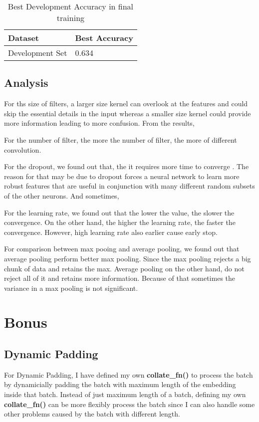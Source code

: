 \documentclass{article}
\begin{document}
\begin{table}[htb]
	\caption{Best Development Accuracy in final training}
	\label{sample-table}
	\centering
	\begin{tabular}{ll}
		\toprule
		\cmidrule{1-2}
		Dataset & Best Accuracy\\
		\midrule
		Development Set & 0.634   \\
		\bottomrule
	\end{tabular}
\end{table}

\subsection{Analysis}
For ths size of filters, a larger size kernel can overlook at the features and could skip the essential details in the input whereas a smaller size kernel could provide more information leading to more confusion. From the results,

For the number of filter, the more the number of filter, the more of different convolution. 

For the dropout, we found out that, the it requires more time to converge . The reason for that may be due to dropout forces a neural network to learn more robust features that are useful in conjunction with many different random subsets of the other neurons. And sometimes, 

For the learning rate, we found out that the lower the value, the slower the convergence. On the other hand, the higher the learning rate, the faster the convergence. However, high learning rate also earlier cause early stop.

For comparison between max pooing and average pooling, we found out that average pooling perform better max pooling. Since the max pooling rejects a big chunk of data and retains the max. Average pooling on the other hand, do not reject all of it and retains more information. Because of that sometimes the variance in a max pooling is not significant.

\section{Bonus}

\subsection{Dynamic Padding}
For Dynamic Padding, I have defined my own \textbf{collate\_fn()} to process the batch by dynamicially padding the batch with maximum length of the embedding inside that batch. Instead of just maximum length of a batch, defining my own \textbf{collate\_fn()} can be more flexibly process the batch since I can also handle some other problems caused by the batch with different length.
\end{document}
